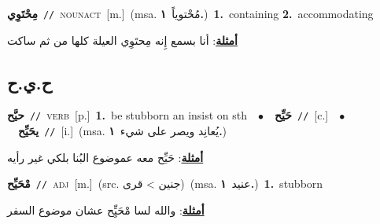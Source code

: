 \documentclass[10pt,a4paper,twoside]{article} %
\begin{document}
\begin{multicols}{2}
{\setlength\topsep{0pt}\textbf{\foreignlanguage{arabic}{مِحْتَوِي}}\ {\color{gray}\texttt{//}\color{black}}\ \textsc{noun\textunderscore act}\ [m.]\ \color{gray}(msa. \foreignlanguage{arabic}{مُحْتوياً}~\foreignlanguage{arabic}{\textbf{١.}})\color{black}\ \textbf{1.}~containing  \textbf{2.}~accommodating\  \begin{flushright}\color{gray}\foreignlanguage{arabic}{\textbf{\underline{\foreignlanguage{arabic}{أمثلة}}}: أنا بسمع إِنه مِحتَوِي العيلة كلها من ثم ساكت}\end{flushright}\color{black}} \vspace{2mm}

\vspace{-3mm}
\subsection*{\color{blue}\foreignlanguage{arabic}{ح.ي.ح}\color{blue}{}} 

{\setlength\topsep{0pt}\textbf{\foreignlanguage{arabic}{حيَّح}}\ {\color{gray}\texttt{//}\color{black}}\ \textsc{verb}\ [p.]\ \textbf{1.}~be stubborn an insist on sth\ \ $\bullet$\ \ \setlength\topsep{0pt}\textbf{\foreignlanguage{arabic}{حَيِّح}}\ {\color{gray}\texttt{//}\color{black}}\ [c.]\ \ $\bullet$\ \ \setlength\topsep{0pt}\textbf{\foreignlanguage{arabic}{يحَيِّح}}\ {\color{gray}\texttt{//}\color{black}}\ [i.]\ \color{gray}(msa. \foreignlanguage{arabic}{يُعانِد ويصر على شيء}~\foreignlanguage{arabic}{\textbf{١.}})\color{black}\  \begin{flushright}\color{gray}\foreignlanguage{arabic}{\textbf{\underline{\foreignlanguage{arabic}{أمثلة}}}: حَيِّح معه عموضوع البُنا بلكي غير رأيه}\end{flushright}\color{black}} \vspace{2mm}

{\setlength\topsep{0pt}\textbf{\foreignlanguage{arabic}{مْحَيِّح}}\ {\color{gray}\texttt{//}\color{black}}\ \textsc{adj}\ [m.]\ (src. \color{gray}\foreignlanguage{arabic}{جنين > قرى}\color{black})\ \color{gray}(msa. \foreignlanguage{arabic}{عنيد}~\foreignlanguage{arabic}{\textbf{١.}})\color{black}\ \textbf{1.}~stubborn\  \begin{flushright}\color{gray}\foreignlanguage{arabic}{\textbf{\underline{\foreignlanguage{arabic}{أمثلة}}}: والله لسا مْحَيِِّح عشان موضوع السفر}\end{flushright}\color{black}} \vspace{2mm}


\end{multicols}
\end{document}
